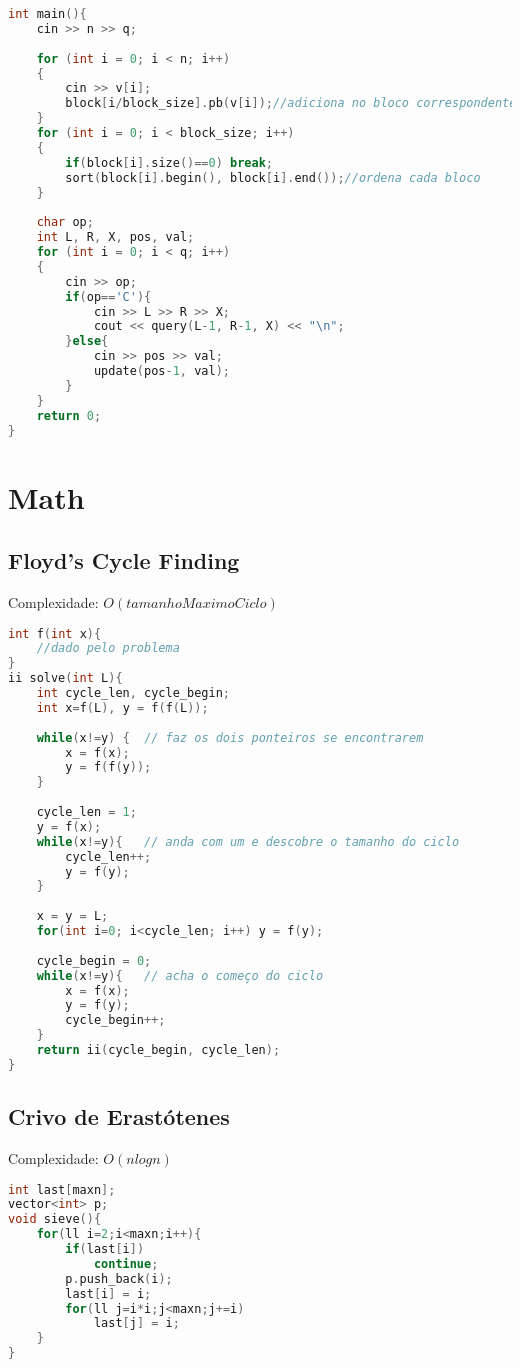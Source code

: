 \documentclass[12pt,a4paper,twoside]{report}
\begin{document}
\begin{lstlisting}[caption=SQRT decomposition em blocos,language=C++]
int main(){
    cin >> n >> q;
     
    for (int i = 0; i < n; i++)
    {
        cin >> v[i];
        block[i/block_size].pb(v[i]);//adiciona no bloco correspondente
    }
    for (int i = 0; i < block_size; i++)
    {
        if(block[i].size()==0) break;
        sort(block[i].begin(), block[i].end());//ordena cada bloco
    }
     
    char op;
    int L, R, X, pos, val;
    for (int i = 0; i < q; i++)
    {
        cin >> op;
        if(op=='C'){
            cin >> L >> R >> X;
            cout << query(L-1, R-1, X) << "\n";
        }else{
            cin >> pos >> val;
            update(pos-1, val);
        }
    }
    return 0;
}
\end{lstlisting}

\chapter{Math}

\section{Floyd’s Cycle Finding}
Complexidade: $O(tamanhoMaximoCiclo)$
\noindent\begin{lstlisting}[caption=Floyd's Cycle Finding Algorithm,language=C++]
int f(int x){
    //dado pelo problema
}
ii solve(int L){    
    int cycle_len, cycle_begin;
    int x=f(L), y = f(f(L));
    
    while(x!=y) {  // faz os dois ponteiros se encontrarem
        x = f(x);
        y = f(f(y));
    }
    
    cycle_len = 1;
    y = f(x);
    while(x!=y){   // anda com um e descobre o tamanho do ciclo
        cycle_len++;
        y = f(y);
    }
    
    x = y = L;
    for(int i=0; i<cycle_len; i++) y = f(y);
    
    cycle_begin = 0;
    while(x!=y){   // acha o começo do ciclo
        x = f(x);
        y = f(y);
        cycle_begin++;
    }
    return ii(cycle_begin, cycle_len);
}
\end{lstlisting}

\section{Crivo de Erastótenes}
Complexidade: $O(n log n)$
\noindent\begin{lstlisting}[caption=Crivo de Erastótenes,language=C++]
int last[maxn];
vector<int> p;
void sieve(){
    for(ll i=2;i<maxn;i++){
        if(last[i])
            continue;
        p.push_back(i);
        last[i] = i;
        for(ll j=i*i;j<maxn;j+=i)
            last[j] = i;
    }
}
\end{lstlisting}
\end{document}
